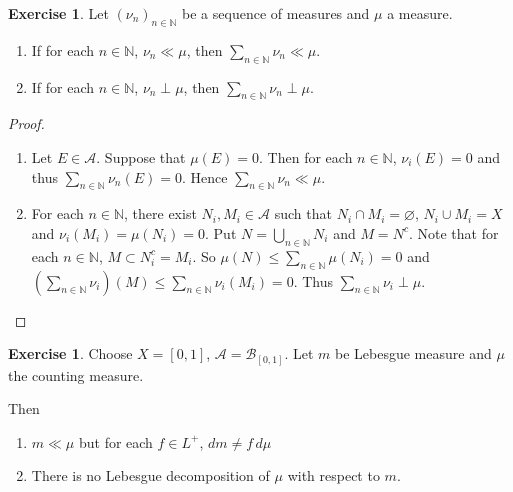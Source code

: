 \documentclass[12pt]{amsart}
\theoremstyle{definition}
\newtheorem{ex}[definition]{Exercise}
\newcommand{\N}{\mathbb{N}}
\newcommand{\MA}{\mathcal{A}}
\newcommand{\MB}{\mathcal{B}}
\newcommand{\dmu}{\, d \mu}
\newcommand{\lex}[1]{\label{ex:#1}}
\begin{document}
	\begin{ex} \lex{00000} 
		Let $(\nu_n)_{n \in \N}$ be a sequence of measures and $\mu$ a measure. 
		\begin{enumerate}
			\item If for each $n \in \N$, $\nu_n \ll \mu$, then $\sum_{n \in \N} \nu_n \ll \mu$. 
			\item If for each $n \in \N$, $\nu_n \perp \mu$, then $\sum_{n \in \N} \nu_n \perp \mu$.
		\end{enumerate} 
	\end{ex}
	
	\begin{proof}
		\begin{enumerate}
			\item Let $E \in \MA$. Suppose that $\mu(E) = 0$. Then for each $n \in \N$, $\nu_i(E) = 0$ and thus $\sum_{n \in \N} \nu_n(E) = 0$. Hence $\sum_{n \in \N} \nu_n \ll \mu$.
			\item For each $n \in \N$, there exist $N_i, M_i \in \MA$ such that $N_i \cap M_i = \varnothing$, $N_i \cup M_i = X$ and $\nu_i(M_i) = \mu(N_i) = 0$. Put $N = \bigcup_{n \in \N} N_i$ and $M = N^c$. Note that for each $n \in \N$, $M \subset N_i^c = M_i$. So $\mu(N) \leq \sum_{n \in \N} \mu(N_i) = 0$ and $(\sum_{n \in \N} \nu_i) (M) \leq \sum_{n \in \N} \nu_i(M_i) = 0$. Thus $\sum_{n \in \N} \nu_i \perp \mu$.
		\end{enumerate}
	\end{proof}
	
	
	\begin{ex} \lex{00000} 
		Choose $X = [0,1]$, $\MA = \MB_{[0,1]}$. Let $m$ be Lebesgue measure and $\mu$ the counting measure. 
		
		Then 
		\begin{enumerate}
			\item $m \ll \mu$ but for each $f \in L^+$, $dm \neq f \dmu$
			\item There is no Lebesgue decomposition of $\mu$ with respect to $m$.
		\end{enumerate}
	\end{ex}
	
\end{document}
